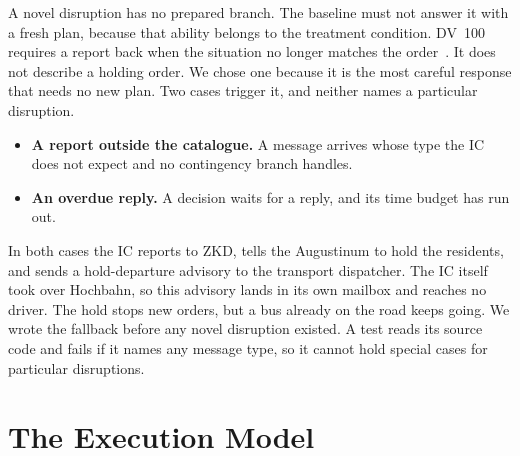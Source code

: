 A novel disruption has no prepared branch. The baseline must not answer it
with a fresh plan, because that ability belongs to the treatment condition.
DV~100 requires a report back when the situation no longer matches the
order~\cite[37]{fwdv100}. It does not describe a holding order. We chose one
because it is the most careful response that needs no new plan. Two cases
trigger it, and neither names a particular disruption.
\begin{itemize}
  \item \textbf{A report outside the catalogue.} A message arrives whose type
  the IC does not expect and no contingency branch handles.
  \item \textbf{An overdue reply.} A decision waits for a reply, and its time
  budget has run out.
\end{itemize}
In both cases the IC reports to ZKD, tells the Augustinum to hold the
residents, and sends a hold-departure advisory to the transport dispatcher.
The IC itself took over Hochbahn, so this advisory lands in its own mailbox and
reaches no driver. The hold stops new orders, but a bus already on the road
keeps going. We wrote the fallback before any novel disruption existed. A test
reads its source code and fails if it names any message type, so it cannot
hold special cases for particular disruptions.

\section{The Execution Model}
\label{sec:wf:world}

